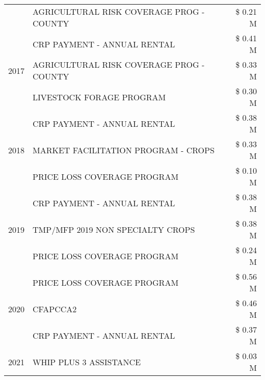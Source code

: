 \begin{tabular}{llr}
 & AGRICULTURAL RISK COVERAGE PROG - COUNTY & \$ 0.21 M \\
\cline{1-3}
\multirow[t]{3}{*}{2017} & CRP PAYMENT - ANNUAL RENTAL & \$ 0.41 M \\
 & AGRICULTURAL RISK COVERAGE PROG - COUNTY & \$ 0.33 M \\
 & LIVESTOCK FORAGE PROGRAM & \$ 0.30 M \\
\cline{1-3}
\multirow[t]{3}{*}{2018} & CRP PAYMENT - ANNUAL RENTAL & \$ 0.38 M \\
 & MARKET FACILITATION PROGRAM - CROPS & \$ 0.33 M \\
 & PRICE LOSS COVERAGE PROGRAM & \$ 0.10 M \\
\cline{1-3}
\multirow[t]{3}{*}{2019} & CRP PAYMENT - ANNUAL RENTAL & \$ 0.38 M \\
 & TMP/MFP 2019 NON SPECIALTY CROPS & \$ 0.38 M \\
 & PRICE LOSS COVERAGE PROGRAM & \$ 0.24 M \\
\cline{1-3}
\multirow[t]{3}{*}{2020} & PRICE LOSS COVERAGE PROGRAM & \$ 0.56 M \\
 & CFAPCCA2 & \$ 0.46 M \\
 & CRP PAYMENT - ANNUAL RENTAL & \$ 0.37 M \\
\cline{1-3}
2021 & WHIP PLUS 3 ASSISTANCE & \$ 0.03 M \\
\cline{1-3}
\bottomrule
\end{tabular}
